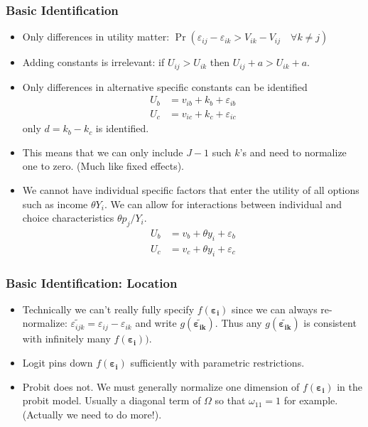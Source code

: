 \documentclass[aspectratio=169,11pt]{beamer}
\begin{document}
\begin{frame}
\frametitle{Basic Identification}
\small
\begin{itemize}
\item Only differences in utility matter: $\Pr( \varepsilon_{ij}-\varepsilon_{ik} > V_{ik} - V_{ij} \quad \forall k \neq j)$
\item Adding constants is irrelevant: if $U_{ij} > U_{ik}$ then $U_{ij} + a > U_{ik} + a$.
\item Only differences in alternative specific constants can be identified
\begin{align*}
U_b &= v_{ib} + k_b  + \varepsilon_{ib}\\
U_c &= v_{ic} + k_c  + \varepsilon_{ic}
\end{align*}
only $d = k_b - k_c$ is identified.
\item This means that we can only include $J-1$ such $k$'s and need to normalize one to zero. (Much like fixed effects).
\item We cannot have individual specific factors that enter the utility of all options such as income $\theta Y_i$. We can allow for interactions between individual and choice characteristics $\theta p_{j}/ Y_i$.
\begin{align*}
U_b &= v_{b} + \theta y_i  + \varepsilon_b\\
U_c &= v_{c} + \theta y_i  + \varepsilon_c
\end{align*}

\end{itemize}
\end{frame}

\begin{frame}
\frametitle{Basic Identification: Location}
\begin{itemize}
\item Technically we can't really fully specify $f(\boldsymbol{\varepsilon_i})$ since we can always re-normalize: $\widetilde{\varepsilon_{ijk}} = \varepsilon_{ij} - \varepsilon_{ik}$ and write $g(\widetilde{\boldsymbol{\varepsilon_{ik}}})$. Thus any $g(\widetilde{\boldsymbol{\varepsilon_{ik}}})$ is consistent with infinitely many $f(\boldsymbol{\varepsilon_i}))$.
\item Logit pins down $f(\boldsymbol{\varepsilon_i})$ sufficiently with parametric restrictions.
\item Probit does not. We must generally normalize one dimension of $f(\boldsymbol{\varepsilon_i})$ in the probit model. Usually a diagonal term of $\Omega$ so that $\omega_{11} =1$ for example. (Actually we need to do more!).
\end{itemize}
\end{frame}
\end{document}
